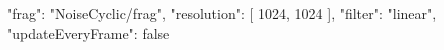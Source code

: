 {
  "frag": "NoiseCyclic/frag",
  "resolution": [
    1024,
    1024
  ],
  "filter": "linear",
  "updateEveryFrame": false
}